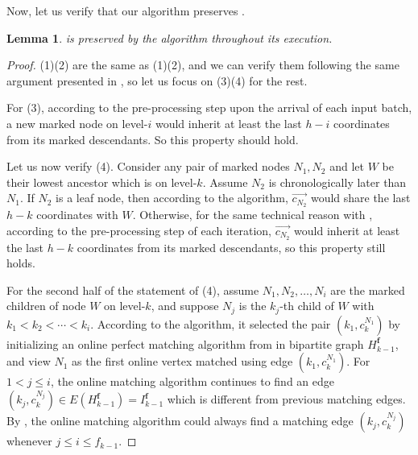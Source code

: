 \documentclass[11pt,a4paper]{article}
\newtheorem{lemma}{Lemma}[section]
\newcommand{\freq}{\mathbf{f}}
\newcommand{\brac}[1]{\left(#1\right)}
\begin{document}
Now, let us verify that our algorithm preserves .
\begin{lemma}
	 is preserved by the algorithm throughout its execution.
\end{lemma}
\begin{proof}
	(1)(2) are the same as (1)(2), and we can verify them following the same argument presented in , so let us focus on (3)(4) for the rest.
	
	For (3), according to the pre-processing step upon the arrival of each input batch, a new marked node on level-$i$ would inherit at least the last $h-i$ coordinates from its marked descendants. So this property should hold.
	
	Let us now verify (4). Consider any pair of marked nodes $N_1, N_2$ and let $W$ be their lowest ancestor which is on level-$k$. Assume $N_2$ is chronologically later than $N_1$. If $N_2$ is a leaf node, then according to the algorithm, $\overrightarrow{c_{N_2}}$ would share the last $h-k$ coordinates with $W$. Otherwise, for the same technical reason with , according to the pre-processing step of each iteration, $\overrightarrow{c_{N_2}}$ would inherit at least the last $h-k$ coordinates from its marked descendants, so this property still holds.
	
	For the second half of the statement of (4), assume $N_1, N_2, \ldots, N_i$ are the marked children of node $W$ on level-$k$, and suppose $N_j$ is the $k_j$-th child of $W$ with $k_1< k_2<\cdots < k_i$. According to the algorithm, it selected the pair $\brac{k_1, c_k^{N_1}}$ by initializing an online perfect matching algorithm from  in bipartite graph $H_{k-1}^\freq$, and view $N_1$ as the first online vertex matched using edge $\brac{k_1, c_k^{N_1}}$. For $1<j\leq i$, the online matching algorithm continues to find an edge $\brac{k_j, c_k^{N_j}}\in E(H_{k-1}^\freq) = I_{k-1}^\freq$ which is different from previous matching edges. By , the online matching algorithm could always find a matching edge $\brac{k_j, c_k^{N_j}}$ whenever $j\leq i\leq f_{k-1}$.
\end{proof}
\end{document}
